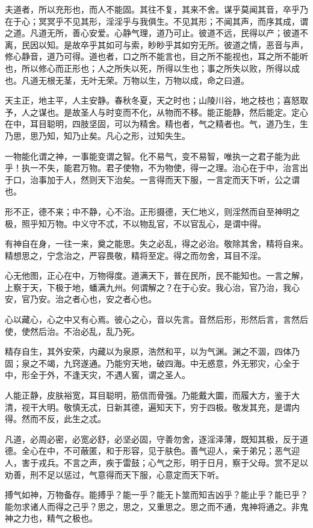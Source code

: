 \documentclass[]{article}
\begin{document}
夫道者，所以充形也，而人不能固。其往不复，其来不舍。谋乎莫闻其音，卒乎乃在于心；冥冥乎不见其形，淫淫乎与我俱生。不见其形；不闻其声，而序其成，谓之道。凡道无所，善心安爱。心静气理，道乃可止。彼道不远，民得以产；彼道不离，民因以知。是故卒乎其如可与索，眇眇乎其如穷无所。彼道之情，恶音与声，修心静音，道乃可得。道也者，口之所不能言也，目之所不能视也，耳之所不能听也，所以修心而正形也；人之所失以死，所得以生也；事之所失以败，所得以成也。凡道无根无茎，无叶无荣。万物以生，万物以成，命之曰道。

天主正，地主平，人主安静。春秋冬夏，天之时也；山陵川谷，地之枝也；喜怒取予，人之谋也。是故圣人与时变而不化，从物而不移。能正能静，然后能定。定心在中，耳目聪明，四肢坚固，可以为精舍。精也者，气之精者也。气，道乃生，生乃思，思乃知，知乃止矣。凡心之形，过知失生。

一物能化谓之神，一事能变谓之智。化不易气，变不易智，唯执一之君子能为此乎！执一不失，能君万物。君子使物，不为物使，得一之理。治心在于中，治言出于口，治事加于人，然则天下治矣。一言得而天下服，一言定而天下听，公之谓也。

形不正，德不来；中不静，心不治。正形摄德，天仁地义，则淫然而自至神明之极，照乎知万物。中义守不忒，不以物乱官，不以官乱心，是谓中得。

有神自在身，一往一来，奠之能思。失之必乱，得之必治。敬除其舍，精将自来。精想思之，宁念治之，严容畏敬，精将至定。得之而勿舍，耳目不淫。

心无他图，正心在中，万物得度。道满天下，普在民所，民不能知也。一言之解，上察于天，下极于地，蟠满九州。何谓解之？在于心安。我心治，官乃治，我心安，官乃安。治之者心也，安之者心也。

心以藏心，心之中又有心焉。彼心之心，音以先言。音然后形，形然后言，言然后使，使然后治。不治必乱，乱乃死。

精存自生，其外安荣，内藏以为泉原，浩然和平，以为气渊。渊之不涸，四体乃固；泉之不竭，九窍遂通。乃能穷天地，破四海。中无惑意，外无邪灾，心全于中，形全于外，不逢天灾，不遇人窖，谓之圣人。

人能正静，皮肤裕宽，耳目聪明，筋信而骨强。乃能戴大圜，而履大方，鉴于大清，视干大明。敬慎无忒，日新其德，遍知天下，穷于四极。敬发其充，是谓内得。然而不反，此生之忒。

凡道，必周必密，必宽必舒，必坚必固，守善勿舍，逐淫泽薄，既知其极，反于道德。全心在中，不可蔽匿，和于形容，见于肤色。善气迎人，亲于弟兄；恶气迎人，害于戎兵。不言之声，疾于雷鼓；心气之形，明于日月，察于父母。赏不足以劝善，刑不足以惩过，气意得而天下服，心意定而天下听。

搏气如神，万物备存。能搏乎？能一乎？能无卜筮而知吉凶乎？能止乎？能已乎？能勿求诸人而得之己乎？思之，思之，又重思之。思之而不通，鬼神将通之。非鬼神之力也，精气之极也。
\end{document}
